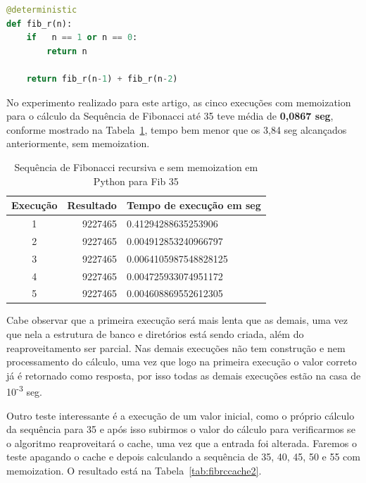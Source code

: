 \documentclass[sigconf]{acmart}
\begin{document}
\renewcommand{\lstlistingname}{Trecho de código}
\begin{lstlisting}[language=Python, caption=Sequência de Fibonacci recursiva com memoization]
@deterministic
def fib_r(n):
    if   n == 1 or n == 0:
        return n

    return fib_r(n-1) + fib_r(n-2)
\end{lstlisting}

No experimento realizado para este artigo, as cinco execuções com memoization para o cálculo da Sequência de Fibonacci até 35 teve média de \textbf{0,0867 seg}, conforme mostrado na Tabela~\ref{tab:fibrccache}, tempo bem menor que os 3,84 seg alcançados anteriormente, sem memoization.

\begin{table}[H]
  \caption{Sequência de Fibonacci recursiva e sem memoization em Python para Fib 35}
  \label{tab:fibrccache}
  \begin{tabular}{crl}
    \toprule
    Execução & Resultado & Tempo de execução em seg\\
    \midrule
    1 & 9227465 & 0.41294288635253906\\
    2 & 9227465 & 0.004912853240966797\\
    3 & 9227465 & 0.0064105987548828125\\
    4 & 9227465 & 0.004725933074951172\\
    5 & 9227465 & 0.004608869552612305\\
  \bottomrule
\end{tabular}
\end{table}

Cabe observar que a primeira execução será mais lenta que as demais, uma vez que nela a estrutura de banco e diretórios está sendo criada, além do reaproveitamento ser parcial. Nas demais execuções não tem construção e nem processamento do cálculo, uma vez que logo na primeira execução o valor correto já é retornado como resposta, por isso todas as demais execuções estão na casa de 10\textsuperscript{-3} seg.

Outro teste interessante é a execução de um valor inicial, como o próprio cálculo da sequência para 35 e após isso subirmos o valor do cálculo para verificarmos se o algoritmo reaproveitará o cache, uma vez que a entrada foi alterada. Faremos o teste apagando o cache e depois calculando a sequência de 35, 40, 45, 50 e 55 com memoization. O resultado está na Tabela~\ref{tab:fibrccache2}.
\end{document}
